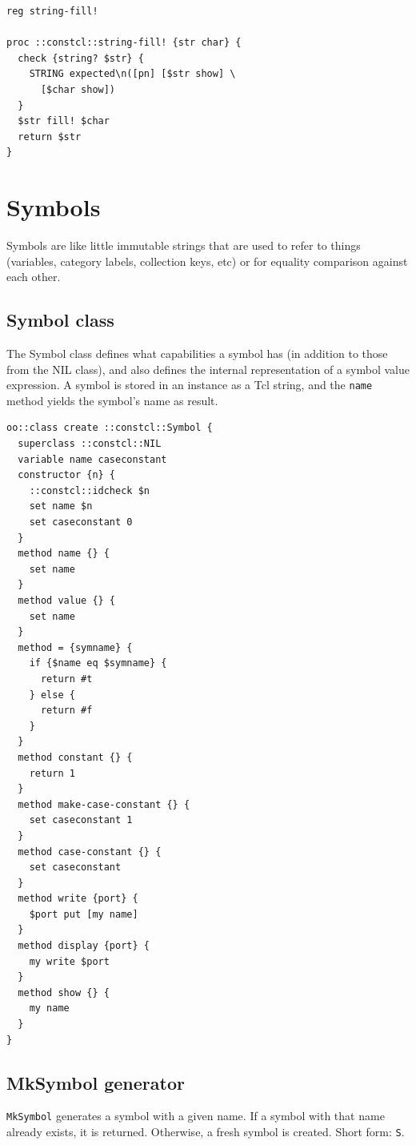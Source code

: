 \documentclass[twoside]{report}
\begin{document}
\begin{lstlisting}
reg string-fill!

proc ::constcl::string-fill! {str char} {
  check {string? $str} {
    STRING expected\n([pn] [$str show] \
      [$char show])
  }
  $str fill! $char
  return $str
}
\end{lstlisting}

\section{Symbols}
\label{symbols}

Symbols are like little immutable strings that are used to refer to things (variables, category labels, collection keys, etc) or for equality comparison against each other.

\subsection{Symbol class}
\label{symbol-class}

The Symbol class defines what capabilities a symbol has (in addition to those from the NIL class), and also defines the internal representation of a symbol value expression. A symbol is stored in an instance as a Tcl string, and the \texttt{name} method yields the symbol's name as result.

\begin{lstlisting}
oo::class create ::constcl::Symbol {
  superclass ::constcl::NIL
  variable name caseconstant
  constructor {n} {
    ::constcl::idcheck $n
    set name $n
    set caseconstant 0
  }
  method name {} {
    set name
  }
  method value {} {
    set name
  }
  method = {symname} {
    if {$name eq $symname} {
      return #t
    } else {
      return #f
    }
  }
  method constant {} {
    return 1
  }
  method make-case-constant {} {
    set caseconstant 1
  }
  method case-constant {} {
    set caseconstant
  }
  method write {port} {
    $port put [my name]
  }
  method display {port} {
    my write $port
  }
  method show {} {
    my name
  }
}
\end{lstlisting}

\subsection{MkSymbol generator}
\label{mksymbol-generator}

\texttt{MkSymbol} generates a symbol with a given name. If a symbol with that name already exists, it is returned. Otherwise, a fresh symbol is created. Short form: \texttt{S}.
\end{document}
